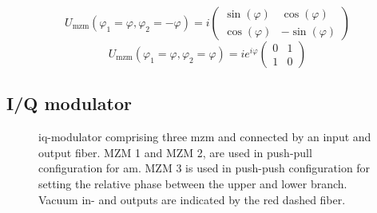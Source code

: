 \begin{equation}
	U_\text{mzm}(\varphi_1=\varphi,\varphi_2=-\varphi)
	=
	i
	\begin{pmatrix}
		\sin(\varphi) & \cos(\varphi) \\
		\cos(\varphi) & -\sin(\varphi)
	\end{pmatrix}
\end{equation}
\begin{equation}
	U_\text{mzm}(\varphi_1=\varphi,\varphi_2=\varphi)
	=
	i
	e^{i\varphi}
	\begin{pmatrix}
		0 & 1 \\
		1 & 0
	\end{pmatrix}
\end{equation}

\subsection{I/Q modulator}

\begin{figure}[htb]
	\centering
	
	\caption{\gls{iq}-modulator comprising three \gls{mzm} and connected by an input and output fiber. MZM 1 and MZM 2, are used in push-pull configuration for \gls{am}. MZM 3 is used in push-push configuration for setting the relative phase between the upper and lower branch. Vacuum in- and outputs are indicated by the red dashed fiber.}
\end{figure}